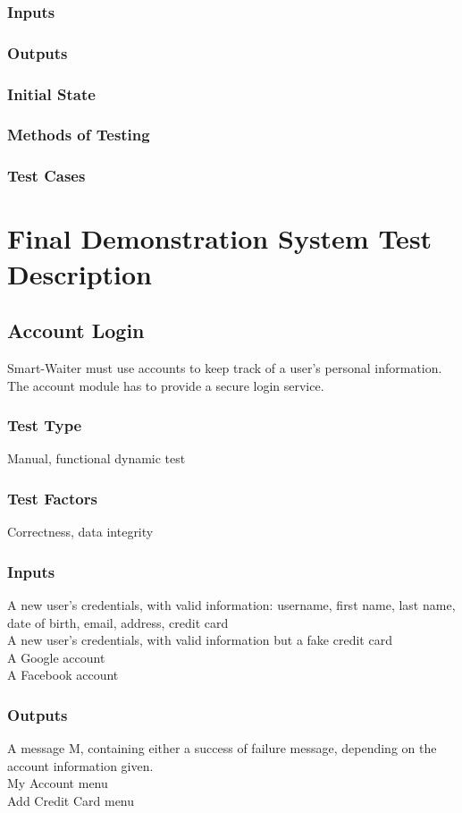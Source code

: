 \documentclass[12pt]{article}
\begin{document}
\subsubsection{Inputs}
\subsubsection{Outputs}
\subsubsection{Initial State}
\subsubsection{Methods of Testing}
\subsubsection{Test Cases}

\section{Final Demonstration System Test Description}


\subsection{Account Login}
Smart-Waiter must use accounts to keep track of a user's personal information. The account module has to provide a secure login service. 
\subsubsection{Test Type}
Manual, functional dynamic test
\subsubsection{Test Factors}
Correctness, data integrity
\subsubsection{Inputs}
A new user's credentials, with valid information: username, first name, last name, date of birth, email, address, credit card \\
A new user's credentials, with valid information but a fake credit card \\
A Google account \\
A Facebook account \\
\subsubsection{Outputs}
A message M, containing either a success of failure message, depending on the account information given. \\
My Account menu \\
Add Credit Card menu \\
\end{document}
